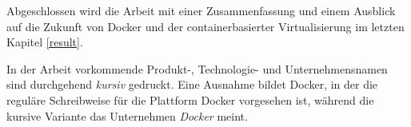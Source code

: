 \documentclass[../main.tex]{subfiles}
\begin{document}

    Abgeschlossen wird die Arbeit mit einer Zusammenfassung und einem Ausblick auf die Zukunft von Docker und der containerbasierter Virtualisierung im letzten Kapitel \ref{result}.

    In der Arbeit vorkommende Produkt-, Technologie- und Unternehmensnamen sind durchgehend \emph{kursiv} gedruckt. Eine Ausnahme bildet Docker, in der die reguläre Schreibweise für die Plattform Docker vorgesehen ist, während die kursive Variante das Unternehmen \emph{Docker} meint.
\end{document}

